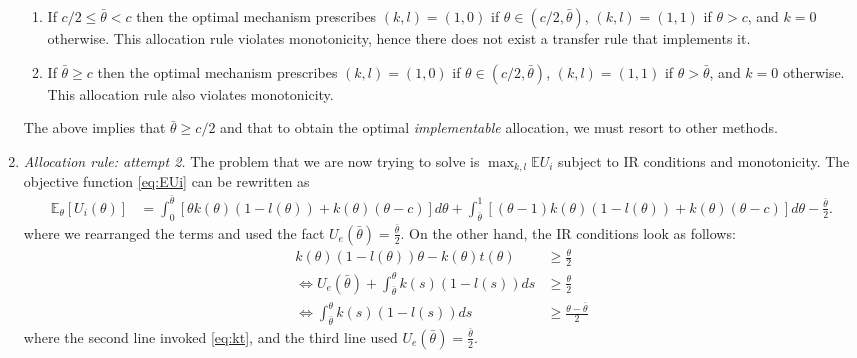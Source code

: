 \documentclass[a4paper]{article}
\begin{document}
\begin{enumerate}
\begin{enumerate}
			\item If $c/2 \leq \bar{\theta} < c$ then the optimal mechanism prescribes $(k,l) = (1,0)$ if $\theta \in (c/2,\bar{\theta})$, $(k,l)=(1,1)$ if $\theta > c$, and $k=0$ otherwise. This allocation rule violates monotonicity, hence there does not exist a transfer rule that implements it.
			
			\item If $\bar{\theta} \geq c$ then the optimal mechanism prescribes $(k,l) = (1,0)$ if $\theta \in (c/2,\bar{\theta})$, $(k,l)=(1,1)$ if $\theta > \bar{\theta}$, and $k=0$ otherwise. This allocation rule also violates monotonicity.
		\end{enumerate}
		The above implies that $\bar{\theta} \geq c/2$ and that to obtain the optimal \emph{implementable} allocation, we must resort to other methods.
		
		\item \emph{Allocation rule: attempt 2.}
		The problem that we are now trying to solve is $\max_{k,l} \mathbb{E} U_i$ subject to IR conditions and monotonicity. 
		The objective function \eqref{eq:EUi} can be rewritten as
		\small
		\begin{align}
			\mathbb{E}_\theta[U_i(\theta)] 
			&= \int_0^{\bar{\theta}} \left[ \theta k(\theta)(1-l(\theta)) + k(\theta) (\theta - c) \right] d\theta + \int_{\bar{\theta}}^1 \left[ (\theta-1) k(\theta)(1-l(\theta)) + k(\theta) (\theta - c) \right] d\theta - \frac{\bar{\theta}}{2}.
			\label{eq:EUi2}
		\end{align}
		\normalsize
		where we rearranged the terms and used the fact $U_e(\bar{\theta}) = \frac{\bar{\theta}}{2}$. On the other hand, the IR conditions look as follows:
		\begin{align}
			k(\theta)(1-l(\theta)) \theta - k(\theta)t(\theta) &\geq \frac{\theta}{2}
			\nonumber
			\\
			\Leftrightarrow
			U_e(\bar{\theta}) + \int_{\bar{\theta}}^{\theta} k(s)(1-l(s)) ds & \geq \frac{\theta}{2}
			\nonumber
			\\
			\Leftrightarrow
			\int_{\bar{\theta}}^{\theta} k(s)(1-l(s)) ds & \geq \frac{\theta-\bar{\theta}}{2}
			\label{eq:IR}
		\end{align}
		where the second line invoked \eqref{eq:kt}, and the third line used $ U_e(\bar{\theta}) = \frac{\bar{\theta}}{2}$.
		

\end{enumerate}
\end{document}
